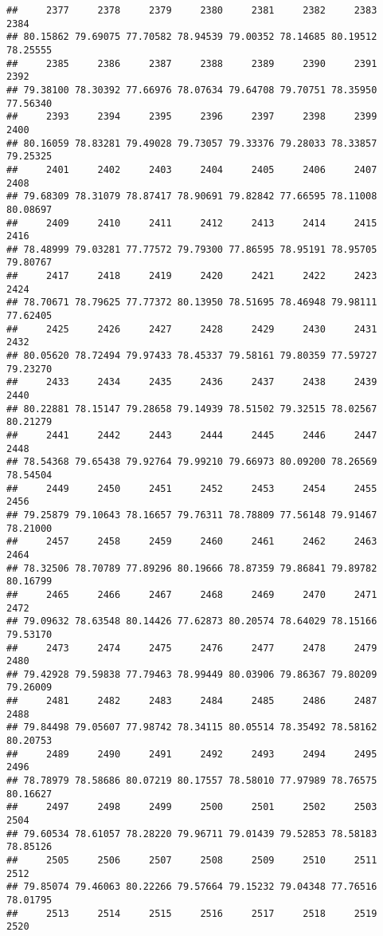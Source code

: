 \documentclass[
]{article}
\begin{document}
\begin{verbatim}
##     2377     2378     2379     2380     2381     2382     2383     2384 
## 80.15862 79.69075 77.70582 78.94539 79.00352 78.14685 80.19512 78.25555 
##     2385     2386     2387     2388     2389     2390     2391     2392 
## 79.38100 78.30392 77.66976 78.07634 79.64708 79.70751 78.35950 77.56340 
##     2393     2394     2395     2396     2397     2398     2399     2400 
## 80.16059 78.83281 79.49028 79.73057 79.33376 79.28033 78.33857 79.25325 
##     2401     2402     2403     2404     2405     2406     2407     2408 
## 79.68309 78.31079 78.87417 78.90691 79.82842 77.66595 78.11008 80.08697 
##     2409     2410     2411     2412     2413     2414     2415     2416 
## 78.48999 79.03281 77.77572 79.79300 77.86595 78.95191 78.95705 79.80767 
##     2417     2418     2419     2420     2421     2422     2423     2424 
## 78.70671 78.79625 77.77372 80.13950 78.51695 78.46948 79.98111 77.62405 
##     2425     2426     2427     2428     2429     2430     2431     2432 
## 80.05620 78.72494 79.97433 78.45337 79.58161 79.80359 77.59727 79.23270 
##     2433     2434     2435     2436     2437     2438     2439     2440 
## 80.22881 78.15147 79.28658 79.14939 78.51502 79.32515 78.02567 80.21279 
##     2441     2442     2443     2444     2445     2446     2447     2448 
## 78.54368 79.65438 79.92764 79.99210 79.66973 80.09200 78.26569 78.54504 
##     2449     2450     2451     2452     2453     2454     2455     2456 
## 79.25879 79.10643 78.16657 79.76311 78.78809 77.56148 79.91467 78.21000 
##     2457     2458     2459     2460     2461     2462     2463     2464 
## 78.32506 78.70789 77.89296 80.19666 78.87359 79.86841 79.89782 80.16799 
##     2465     2466     2467     2468     2469     2470     2471     2472 
## 79.09632 78.63548 80.14426 77.62873 80.20574 78.64029 78.15166 79.53170 
##     2473     2474     2475     2476     2477     2478     2479     2480 
## 79.42928 79.59838 77.79463 78.99449 80.03906 79.86367 79.80209 79.26009 
##     2481     2482     2483     2484     2485     2486     2487     2488 
## 79.84498 79.05607 77.98742 78.34115 80.05514 78.35492 78.58162 80.20753 
##     2489     2490     2491     2492     2493     2494     2495     2496 
## 78.78979 78.58686 80.07219 80.17557 78.58010 77.97989 78.76575 80.16627 
##     2497     2498     2499     2500     2501     2502     2503     2504 
## 79.60534 78.61057 78.28220 79.96711 79.01439 79.52853 78.58183 78.85126 
##     2505     2506     2507     2508     2509     2510     2511     2512 
## 79.85074 79.46063 80.22266 79.57664 79.15232 79.04348 77.76516 78.01795 
##     2513     2514     2515     2516     2517     2518     2519     2520 

\end{verbatim}
\end{document}

